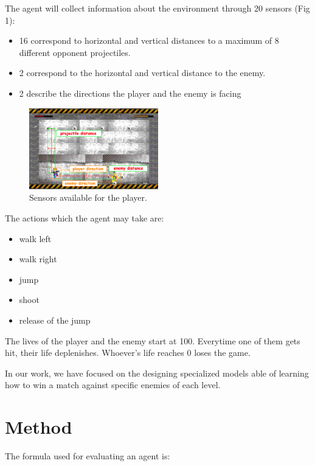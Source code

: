 \documentclass[conference]{IEEEtran}
\begin{document}
The agent will collect information about the environment through 20 sensors (Fig 1):
\begin{itemize}
    \item 16 correspond to horizontal and vertical distances to a maximum of 8 different opponent projectiles.
    \item 2 correspond to the horizontal and vertical distance to the enemy.
    \item 2 describe the directions the player and the enemy is facing
\end{itemize}
\begin{figure}
    \centering
    \includegraphics[width=0.5\textwidth]{images/Evoman3.png}
    \caption{Sensors available for the player.}
    \label{fig:sensors}
\end{figure}
The actions which the agent may take are:
\begin{itemize}
    \item walk left
    \item walk right
    \item jump
    \item shoot
    \item release of the jump
\end{itemize}

The lives of the player and the enemy start at 100.
Everytime one of them gets hit, their life deplenishes.
Whoever's life reaches 0 loses the game.

In our work, we have focused on the designing specialized models able of learning how to win a
match against specific enemies of each level.

\section{Method}\label{sec:method}
The formula used for evaluating an agent is:
\end{document}
